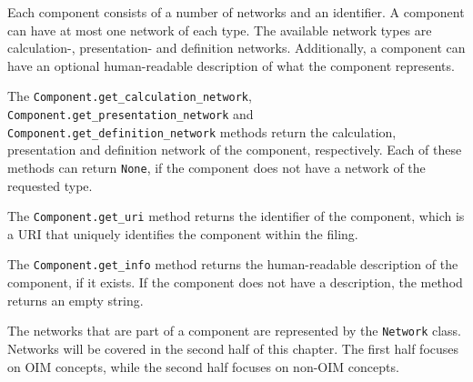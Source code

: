 Each component consists of a number of networks and an identifier.
A component can have at most one network of each type.
The available network types are calculation-, presentation- and definition networks.
Additionally, a component can have an optional human-readable description of what the component represents.

The \texttt{Component.get\_calculation\_network}, \texttt{Component.get\_presentation\_network} and \texttt{Component.get\_definition\_network} methods
return the calculation, presentation and definition network of the component, respectively.
Each of these methods can return \texttt{None}, if the component does not have a network of the requested type.

The \texttt{Component.get\_uri} method returns the identifier of the component,
which is a URI that uniquely identifies the component within the filing.

The \texttt{Component.get\_info} method returns the human-readable description of the component, if it exists.
If the component does not have a description, the method returns an empty string.

The networks that are part of a component are represented by the \texttt{Network} class.
Networks will be covered in the second half of this chapter.
The first half focuses on OIM concepts, while the second half focuses on non-OIM concepts.

